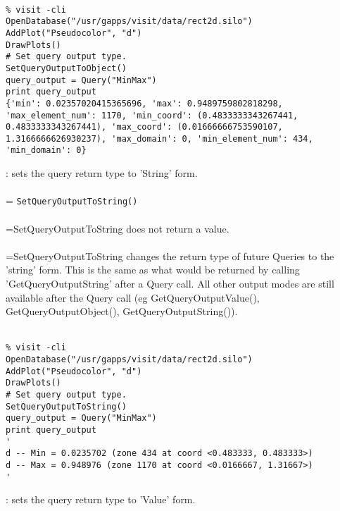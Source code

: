 \documentclass[10pt,a4paper]{report}
\begin{document}
\\[-6mm]
\begin{verbatim}% visit -cli
OpenDatabase("/usr/gapps/visit/data/rect2d.silo")
AddPlot("Pseudocolor", "d")
DrawPlots()
# Set query output type.
SetQueryOutputToObject()
query_output = Query("MinMax")
print query_output
{'min': 0.02357020415365696, 'max': 0.9489759802818298, 'max_element_num': 1170, 'min_coord': (0.4833333343267441, 0.4833333343267441), 'max_coord': (0.01666666753590107, 1.3166666626930237), 'max_domain': 0, 'min_element_num': 434, 'min_domain': 0}
\end{verbatim}
\newpage


{}
: sets the query return type to 'String' form.\\[-3mm]

 \\ 
\hangindent=\parindent 
\verb!SetQueryOutputToString()!\\ [-3mm]

 \\ 
\hangindent=\parindent SetQueryOutputToString does not return a value. \\[-3mm] 

 \\ 
\hangindent=\parindent SetQueryOutputToString changes the return type of future Queries to the 'string' form. This is the same as what would be returned by calling 'GetQueryOutputString' after a Query call. All other output modes are still available after the Query call (eg GetQueryOutputValue(), GetQueryOutputObject(), GetQueryOutputString()). \\[-3mm] 

\\[-6mm]
\begin{verbatim}% visit -cli
OpenDatabase("/usr/gapps/visit/data/rect2d.silo")
AddPlot("Pseudocolor", "d")
DrawPlots()
# Set query output type.
SetQueryOutputToString()
query_output = Query("MinMax")
print query_output
'
d -- Min = 0.0235702 (zone 434 at coord <0.483333, 0.483333>)
d -- Max = 0.948976 (zone 1170 at coord <0.0166667, 1.31667>)
'
\end{verbatim}
\newpage


{}
: sets the query return type to 'Value' form.\\[-3mm]
\end{document}

